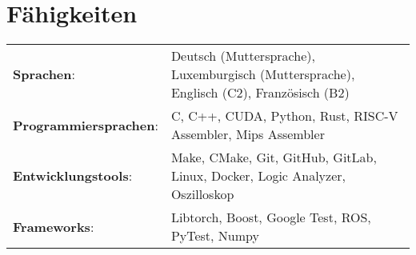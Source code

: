 \documentclass[a4paper,11pt]{article}
\begin{document}
\section{Fähigkeiten}
\footnotesize{
\begin{tabularx}{\linewidth}{@{}l X@{}}
    \textbf{Sprachen}: & { Deutsch (Muttersprache), Luxemburgisch (Muttersprache), Englisch (C2), Französisch (B2)} \\
    \textbf{Programmiersprachen}: & { C, C++, CUDA, Python, Rust, RISC-V Assembler, Mips Assembler} \\
    \textbf{Entwicklungstools}: & { Make, CMake, Git, GitHub, GitLab, Linux, Docker, Logic Analyzer, Oszilloskop} \\
    \textbf{Frameworks}: & { Libtorch, Boost, Google Test, ROS, PyTest, Numpy} \\
\end{tabularx}
}
\end{document}
